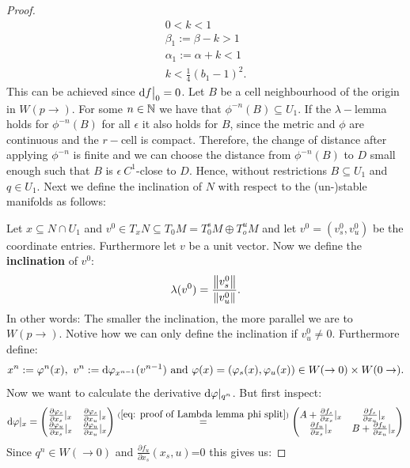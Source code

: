 \begin{proof}
	
	\begin{gather*}
		0<k<1 \\
		\beta_1:=\beta -k >1 \\
		\alpha_1:=\alpha +k <1 \\
		k<\frac{1}{4}(b_1-1)^2.
	\end{gather*}
	This can be achieved since $\mathop{}\!\mathrm{d} f\big|_0=0$.
	Let $B$ be a cell neighbourhood of the origin in $W(p\to )$. For some $n \in \mathbb{N}$ we have that $\phi^{-n}(B)\subseteq U_1$. If the $\lambda-$lemma holds for $\phi^{-n}(B)$ for all $\epsilon$ it also holds for $B$, since the metric and $\phi$ are continuous and the $r-$cell is compact. Therefore, the change of distance after applying $\phi^{-n}$ is finite and we can choose the distance from $\phi^{-n}(B)$ to $D$ small enough such that $B$ is $\epsilon~C^1$-close to $D$. Hence, without restrictions $B\subseteq U_1$ and $q\in U_1$.  Next we define the inclination of $N$ with respect to the (un-)stable manifolds as follows: 
	
	Let $x\subseteq N \cap U_1$ and $v^0\in T_xN\subseteq T_0M=T^s_0M \oplus T^u_oM$ and let $v^0=(v_s^0,v_u^0)$ be the coordinate entries. Furthermore let $v$ be a unit vector. Now we define the \textbf{inclination} of $v^0$:
	\begin{align*}
		\lambda(v^0)=\frac{\left\lVert v^0_s\right\rVert}{\left\lVert v^0_u\right\rVert}.
	\end{align*}
	In other words: The smaller the inclination, the more parallel we are to $W(p\to)$. Notive how we can only define the inclination if $v^0_u\neq 0$. 
	Furthermore define:
	\begin{align*} x^n:=\varphi^n(x), ~v^n:= \mathop{}\!\mathrm{d} \varphi_{x^{n-1}}(v^{n-1}) \text{ and } \varphi(x)=(\varphi_s(x),\varphi_u(x))\in W(\to 0)\times W(0\to).
	\end{align*}
	Now we want to calculate the derivative $\mathop{}\!\mathrm{d} \varphi|_{q^n}$. But first inspect:
	\begin{align*}
		\mathop{}\!\mathrm{d} \varphi|_x=\begin{pmatrix}
			\frac{\partial \varphi_s}{\partial x_s}|_{x} & \frac{\partial \varphi_s}{\partial x_u} |_{x}\\
			\frac{\partial \varphi_u}{\partial x_s} |_{x}& \frac{\partial \varphi_u}{\partial x_u}|_{x}
		\end{pmatrix}\overset{(\ref{eq: proof of Lambda lemma phi split}) }{~=~}
		\begin{pmatrix}
			A+ \frac{\partial f_s}{\partial x_s}|_{x}& \frac{\partial f_s}{\partial x_u}|_{x}\\
			\frac{\partial f_u}{\partial x_s} |_{x} & B+ \frac{\partial f_u}{\partial x_u}|_{x}
		\end{pmatrix} 
	\end{align*} Since $q^n\in W(\to 0)$ and $\frac{\partial f_u}{\partial x_s}(x_s,u)$=0 this gives us:
	

\end{proof}
